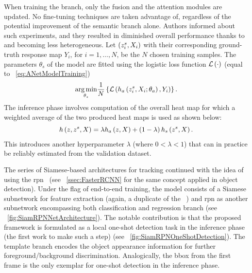 When training the \snet{} branch, only the fusion and the attention modules are updated. No fine-tuning techniques are taken advantage of, regardless of the potential improvement of the semantic branch alone. Authors informed about such experiments, and they resulted in diminished overall performance thanks to \anet{} and \snet{} becoming less heterogeneous. Let $\left( {{z}_{i}^{s}, X_i} \right)$ with their corresponding ground-truth response map $Y_i$, for $i = 1, \dots, N$, be the $N$ chosen training samples. The parameters $\theta_s$ of the \snet{} model are fitted using the logistic loss function ${\mathcal{L}} \left( \cdot \right)$ (equal to \eqstr{}~\ref{eq:ANetModelTraining})
\begin{equation}
    \label{eq:SNetModelTraining}
    \underset{\theta_s}{\operatorname*{arg\,min}}
    \frac{1}{N}
    \left\{ {
        {\mathcal{L}} \left( 
            {h_a} \left( {z}_{i}^{s}, X_i; \theta_a \right),
            Y_i
         \right)
    } \right\}.
\end{equation}
The inference phase involves computation of the overall heat map for which a weighted average of the two produced heat maps is used as shown below:
\begin{equation}
    {h} \left( z, z^s, X \right) = \lambda {h_a} \left( z, X \right) + \left( {1 - \lambda} \right) {h_s} \left( z^s, X \right).
\end{equation}
This introduces another hyperparameter $\lambda$ (where $0 < \lambda < 1$) that can in practice be reliably estimated from the validation dataset.

The series of Siamese-based architectures for tracking continued with the idea of using the \gls{rpn}~\cite{li2018siamrpn} (see \sectionstr{}~\ref{ssec:FasterRCNN} for the same concept applied in object detection). Under the flag of end-to-end training, the \siamrpn{} model consists of a Siamese subnetwork for feature extraction (again, a duplicate of the \siamfc{}~\cite{bertinetto2016siamfc}) and \gls{rpn} as another subnetwork encompassing both classification and regression branch (see \figstr{}~\ref{fig:SiamRPNNetArchitecture}). The notable contribution is that the proposed framework is formulated as a local one-shot detection task in the inference phase (the first work to make such a step) (see \figstr{}~\ref{fig:SiamRPNOneShotDetection}). The template branch encodes the object appearance information for further foreground/background discrimination. Analogically, the \gls{bbox} from the first frame is the only exemplar for one-shot detection in the inference phase.

